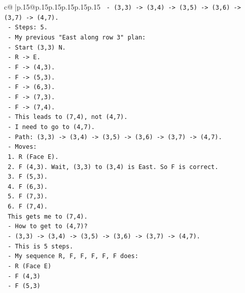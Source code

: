 \documentclass{article}
\begin{document}
{\begin{supertabular}{c@{$\;$}|p{.15\linewidth}@{}p{.15\linewidth}p{.15\linewidth}p{.15\linewidth}p{.15\linewidth}p{.15\linewidth}}
{{{\texttt{               {-} (3,3) {-}> (3,4) {-}> (3,5) {-}> (3,6) {-}> (3,7) {-}> (4,7).} \\
\texttt{               {-} Steps: 5.} \\
\texttt{               {-} My previous "East along row 3" plan:} \\
\texttt{                 {-} Start (3,3) N.} \\
\texttt{                 {-} R {-}> E.} \\
\texttt{                 {-} F {-}> (4,3).} \\
\texttt{                 {-} F {-}> (5,3).} \\
\texttt{                 {-} F {-}> (6,3).} \\
\texttt{                 {-} F {-}> (7,3).} \\
\texttt{                 {-} F {-}> (7,4).} \\
\texttt{                 {-} This leads to (7,4), not (4,7).} \\
\texttt{               {-} I need to go to (4,7).} \\
\texttt{               {-} Path: (3,3) {-}> (3,4) {-}> (3,5) {-}> (3,6) {-}> (3,7) {-}> (4,7).} \\
\texttt{               {-} Moves:} \\
\texttt{                 1. R (Face E).} \\
\texttt{                 2. F (4,3). Wait, (3,3) to (3,4) is East. So F is correct.} \\
\texttt{                 3. F (5,3).} \\
\texttt{                 4. F (6,3).} \\
\texttt{                 5. F (7,3).} \\
\texttt{                 6. F (7,4).} \\
\texttt{                 This gets me to (7,4).} \\
\texttt{               {-} How to get to (4,7)?} \\
\texttt{                 {-} (3,3) {-}> (3,4) {-}> (3,5) {-}> (3,6) {-}> (3,7) {-}> (4,7).} \\
\texttt{                 {-} This is 5 steps.} \\
\texttt{                 {-} My sequence R, F, F, F, F, F does:} \\
\texttt{                   {-} R (Face E)} \\
\texttt{                   {-} F (4,3)} \\
\texttt{                   {-} F (5,3)} \\
}}}
\end{supertabular}}
\end{document}

